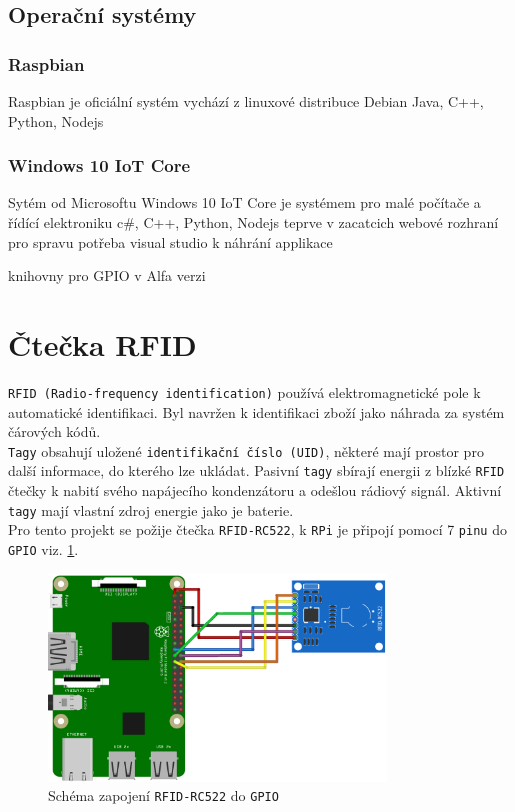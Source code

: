 \documentclass{bakalarka}
\begin{document}
		
		\subsection{Operační systémy}
			\subsubsection{Raspbian}
				Raspbian je oficiální systém
			vychází z linuxové distribuce Debian
			Java, C++, Python, Nodejs
			\subsubsection{Windows 10 IoT Core}
				Sytém od Microsoftu Windows 10 IoT Core je systémem pro malé počítače a řídící elektroniku 
			c\#, C++, Python, Nodejs
			teprve v zacatcich
			webové rozhraní pro spravu
			potřeba visual studio k náhrání applikace
			
			knihovny pro GPIO v Alfa verzi
			
	\section{Čtečka RFID}
		\texttt{RFID (Radio-frequency identification)} používá elektromagnetické pole k automatické identifikaci. Byl navržen k identifikaci zboží jako náhrada za systém čárových kódů.\\
	\texttt{Tagy} obsahují uložené \texttt{identifikační číslo (UID)}, některé mají prostor pro další informace, do kterého lze ukládat. Pasivní \texttt{tagy} sbírají energii z blízké \texttt{RFID} čtečky k nabití svého napájecího kondenzátoru a odešlou rádiový signál. Aktivní \texttt{tagy} mají vlastní zdroj energie jako je baterie.\\
	Pro tento projekt se požije čtečka \texttt{RFID-RC522}, k \texttt{RPi} je připojí pomocí 7 \texttt{pinu} do \texttt{GPIO} viz. \ref{fig:gpio_rfid}.


\begin{figure}[h]
		\centering
		\includegraphics[width=0.8\textwidth]{../images/gpio_rfid.png}	
		\caption{Schéma zapojení \texttt{RFID-RC522} do \texttt{GPIO}}
		\label{fig:gpio_rfid}
	\end{figure}
\end{document}
